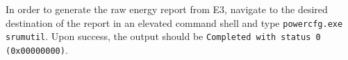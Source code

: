 In order to generate the raw energy report from E3, navigate to the desired destination of the report in an elevated command shell and type \texttt{powercfg.exe \\srumutil}. Upon success, the output should be \texttt{Completed with status 0 (0x00000000)}.


% 